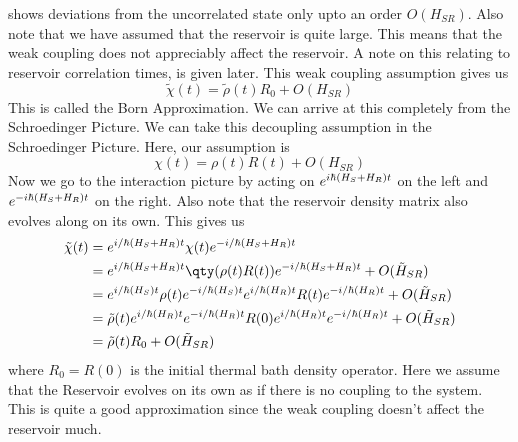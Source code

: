 \documentclass{scrartcl}
\newcommand{\1}{\mathbbm{1}}
\newcommand{\ihsr}{\tilde{H}_{SR}}
\begin{document}
shows deviations from the uncorrelated state only upto an order $O(H_{SR})$. Also note that we have assumed that the
reservoir is quite large. This means that the weak coupling does not appreciably affect the reservoir.
A note on this relating to reservoir correlation times, is given later.
This weak coupling assumption gives us
\begin{equation*}
	\tilde{\chi}(t) = \tilde{\rho}(t) R_0  + O(H_{SR})  \label{eq:born_assumption}
\end{equation*}
This is called the Born Approximation. We can arrive at this completely from the Schroedinger Picture. We can take
this decoupling assumption in the Schroedinger Picture. Here, our assumption is
\[ \chi (t)  = \rho(t) R(t) + O(H_{SR})\]
Now we go to the interaction picture by acting on \(e^{i\/\hbar (H_S+H_R)t}\) on the left and \(e^{-i\/\hbar (H_S+H_R)t}\) on the right.
Also note that the reservoir density matrix also evolves along on its own. This gives us
\begin{align}
	\tilde{\chi}(t) & = e^{i\slash \hbar (H_S + H_R)t} \chi (t) e^{-i\slash \hbar (H_S + H_R)t}                                                                 \\ \nonumber
	                & = e^{i\slash \hbar (H_S + H_R)t} \qty(\rho(t) R(t)) e^{-i\slash \hbar (H_S + H_R)t} + O(\ihsr)                                            \\ \nonumber
	                & = e^{i\slash \hbar (H_S )t} \rho(t) e^{-i\slash \hbar (H_S)t} e^{i\slash \hbar (H_R )t} R(t) e^{-i\slash \hbar (H_R)t} + O(\ihsr)         \\ \nonumber
	                & = \tilde{\rho}(t) e^{i\slash \hbar (H_R )t} e^{-i\slash \hbar (H_R)t} R(0) e^{i\slash \hbar (H_R )t} e^{-i\slash \hbar (H_R)t} + O(\ihsr) \\ \nonumber
	                & = \tilde{\rho}(t) R_0 + O(\ihsr)
\end{align}
where $R_0 = R(0)$ is the initial thermal bath density operator. Here we assume that the Reservoir evolves on its own as if there
is no coupling to the system. This is quite a good approximation since the weak coupling doesn't affect the reservoir much.
\end{document}
